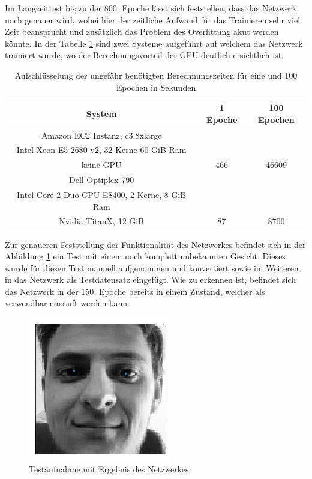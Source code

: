 \noindent
Im Langzeittest bis zu der 800. Epoche lässt sich feststellen, dass das Netzwerk noch genauer wird, wobei hier der zeitliche Aufwand für das Trainieren sehr viel Zeit beansprucht und zusätzlich das Problem des Overfittung akut werden könnte. 
In der Tabelle \ref{tab:time} sind zwei Systeme aufgeführt auf welchem das Netzwerk trainiert wurde, wo der Berechnungsvorteil der GPU deutlich ersichtlich ist. 
\begin{table}[htb]%
\centering%
\begin{tabular}{c c c}
System & 1 Epoche & 100 Epochen \\ 
\hline 
Amazon EC2 Instanz, c3.8xlarge \\ Intel Xeon E5-2680 v2, 32 Kerne 60 GiB Ram \\ keine GPU & 466 & 46609 \\ 
\hline 
Dell Optiplex 790 \\ Intel Core 2 Duo CPU E8400, 2 Kerne, 8 GiB Ram \\ Nvidia TitanX, 12 GiB & 87 & 8700 \\ 
\end{tabular} 
\caption{Aufschlüsselung der ungefähr benötigten Berechnungszeiten für eine und 100 Epochen in Sekunden}
\label{tab:time}
\end{table} \phantom \newline

\noindent
Zur genaueren Feststellung der Funktionalität des Netzwerkes befindet sich in der Abbildung \ref{fig:meTest} ein Test mit einem noch komplett unbekannten Gesicht. 
Dieses wurde für diesen Test manuell aufgenommen und konvertiert sowie im Weiteren in das Netzwerk als Testdatensatz eingefügt. 
Wie zu erkennen ist, befindet sich das Netzwerk in der 150. Epoche bereits in einem Zustand, welcher als verwendbar einstuft werden kann. 
\begin{figure}[ht!]
	\centering
	\includegraphics[scale=0.8]{images/me-test.png}
	\caption{Testaufnahme mit Ergebnis des Netzwerkes}
	\label{fig:meTest}
\end{figure}

